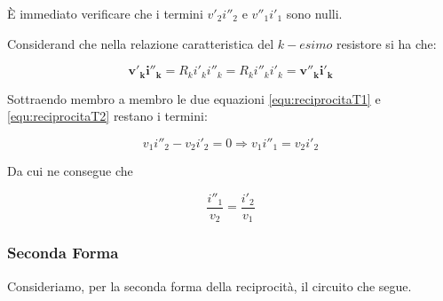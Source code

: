 \documentclass[a4paper]{report}
\begin{document}
\`E immediato verificare che i termini $v'_2i''_2$ e $v''_1i'_1$ sono
nulli.

Considerand che nella relazione caratteristica del $k-esimo$ resistore
si ha che:

\[
\mathbf{v'_ki''_k}=R_ki'_ki''_k=R_ki''_ki'_k=\mathbf{v''_ki'_k}
\]

Sottraendo membro a membro le due equazioni \ref{equ:reciprocitaT1} e
\ref{equ:reciprocitaT2} restano i termini:

\[
v_1i''_2-v_2i'_2=0 \Longrightarrow v_1i''_1=v_2i'_2
\]

Da cui ne consegue che

\[
\dfrac{i''_1}{v_2}=\dfrac{i'_2}{v_1}
\]

\subsubsection{Seconda Forma}

Consideriamo, per la seconda forma della reciprocit\`a, il circuito
che segue.
\end{document}
